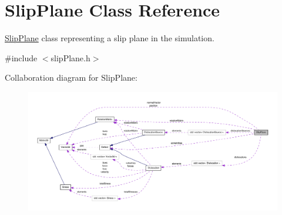 \hypertarget{classSlipPlane}{\section{\-Slip\-Plane \-Class \-Reference}
\label{db/d25/classSlipPlane}
}


\hyperlink{classSlipPlane}{\-Slip\-Plane} class representing a slip plane in the simulation.  




{\ttfamily \#include $<$slip\-Plane.\-h$>$}



\-Collaboration diagram for \-Slip\-Plane\-:
\nopagebreak
\begin{figure}[H]
\begin{center}
\leavevmode
\includegraphics[width=350pt]{d2/da3/classSlipPlane__coll__graph}
\end{center}
\end{figure}
